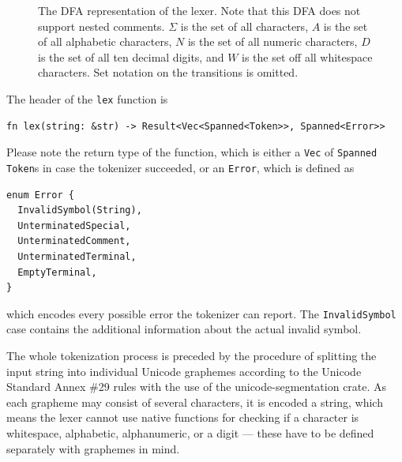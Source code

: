 \documentclass[english,engineering]{wizthesis}
\begin{document}
\begin{figure}[H]
{
  }
  \caption{The DFA representation of the lexer. Note that this DFA does not
  support nested comments. $\Sigma$ is the set of all characters, $A$ is the set
  of all alphabetic characters, $N$ is the set of all numeric characters, $D$ is
  the set of all ten decimal digits, and $W$ is the set off all whitespace
  characters. Set notation on the transitions is omitted.}
  \label{fig:lexer-dfa}
\end{figure}

The header of the \texttt{lex} function is
\begin{verbatim}
fn lex(string: &str) -> Result<Vec<Spanned<Token>>, Spanned<Error>>
\end{verbatim}
Please note the return type of the function, which is either a \texttt{Vec} of
\texttt{Spanned} \texttt{Token}s in case the tokenizer succeeded, or an
\texttt{Error}, which is defined as
\begin{listing}[H]
  \begin{verbatim}
enum Error {
  InvalidSymbol(String),
  UnterminatedSpecial,
  UnterminatedComment,
  UnterminatedTerminal,
  EmptyTerminal,
}
  \end{verbatim}
\end{listing}
\noindent which encodes every possible error the tokenizer can report. The
\texttt{InvalidSymbol} case contains the additional information about the actual
invalid symbol.

The whole tokenization process is preceded by the procedure of splitting the
input string into individual Unicode graphemes according to the Unicode Standard
Annex \#29 \cite{unicode-standard-annex-29} rules with the use of the
unicode-segmentation crate. As each grapheme may consist of several characters,
it is encoded a string, which means the lexer cannot use native functions for
checking if a character is whitespace, alphabetic, alphanumeric, or a digit ---
these have to be defined separately with graphemes in mind.
\end{document}
